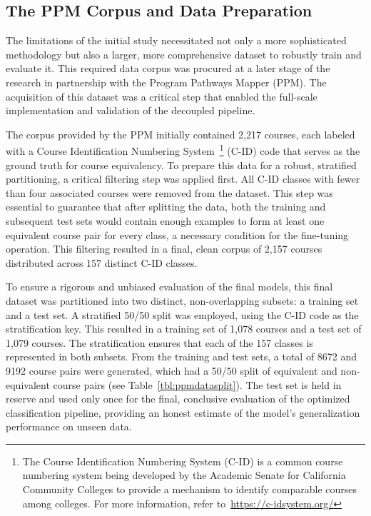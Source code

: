 \subsection{The PPM Corpus and Data Preparation}\label{ch:3.2.1}
The limitations of the initial study necessitated not only a more sophisticated methodology but also a larger, more comprehensive dataset to robustly train and evaluate it. This required data corpus was procured at a later stage of the research in partnership with the Program Pathways Mapper (PPM). The acquisition of this dataset was a critical step that enabled the full-scale implementation and validation of the decoupled pipeline.

The corpus provided by the PPM initially contained 2,217 courses, each labeled with a Course Identification Numbering System~\footnote{The Course Identification Numbering System (C-ID) is a common course numbering system being developed by the Academic Senate for California Community Colleges to provide a mechanism to identify comparable courses among colleges.  For more information, refer to~\url{https://c-idsystem.org/}} (C-ID) code that serves as the ground truth for course equivalency. To prepare this data for a robust, stratified partitioning, a critical filtering step was applied first. All C-ID classes with fewer than four associated courses were removed from the dataset. This step was essential to guarantee that after splitting the data, both the training and subsequent test sets would contain enough examples to form at least one equivalent course pair for every class, a necessary condition for the fine-tuning operation. This filtering resulted in a final, clean corpus of 2,157 courses distributed across 157 distinct C-ID classes.

To ensure a rigorous and unbiased evaluation of the final models, this final dataset was partitioned into two distinct, non-overlapping subsets: a training set and a test set. A stratified 50/50 split was employed, using the C-ID code as the stratification key. This resulted in a training set of 1,078 courses and a test set of 1,079 courses. The stratification ensures that each of the 157 classes is represented in both subsets. From the training and test sets, a total of 8672 and 9192 course pairs were generated, which had a 50/50 split of equivalent and non-equivalent course pairs (see Table~\ref{tbl:ppmdatasplit}).  The test set is held in reserve and used only once for the final, conclusive evaluation of the optimized classification pipeline, providing an honest estimate of the model's generalization performance on unseen data.

